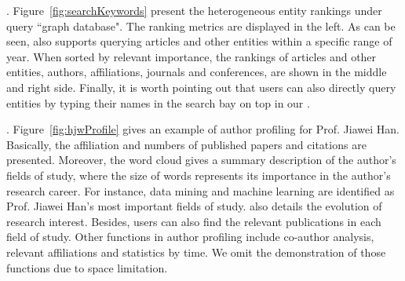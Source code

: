
.
Figure~\ref{fig:searchKeywords} present the heterogeneous entity rankings under query ``graph database".
%
The ranking metrics are displayed in the left. As can be seen, \oursystem also supports querying articles and other entities within a specific range of year.
When sorted by relevant importance, the rankings of articles and other entities, \ie authors, affiliations, journals and conferences, are shown in the middle and right side.
%
Finally, it is worth pointing out that users can also directly query entities by typing their names in the search bay on top in our \oursystem.




.
Figure~\ref{fig:hjwProfile} gives an example of author profiling for Prof. Jiawei Han.
Basically, the affiliation and numbers of published papers and citations are presented.
Moreover, the word cloud gives a summary description of the author's fields of study, where the size of words represents its importance in the author's research career. For instance, data mining and machine learning are identified as Prof. Jiawei Han's most important fields of study.
\oursystem also details the evolution of research interest. %
Besides, users can also find the relevant publications in each field of study. Other functions in author profiling include co-author analysis, relevant affiliations and statistics by time. We omit the demonstration of those functions due to space limitation.


